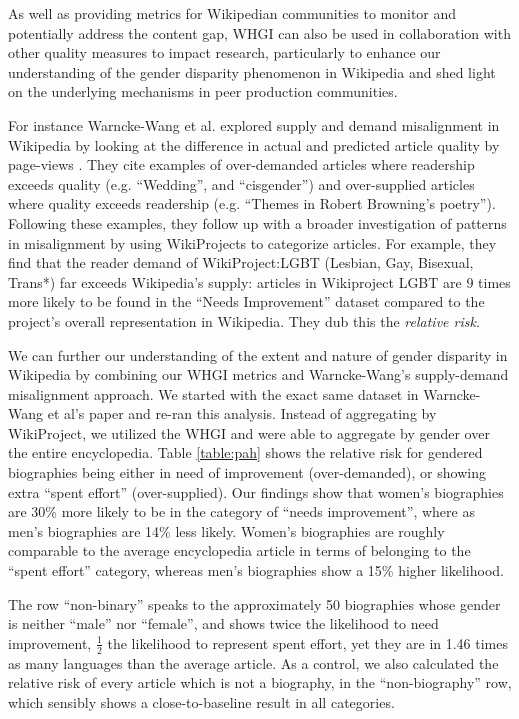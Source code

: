 \documentclass{sig-alternate-05-2015}
\begin{document}
As well as providing metrics for Wikipedian communities to monitor and potentially address the content gap, WHGI can also be used in collaboration with other quality measures to impact research, particularly to enhance our understanding of the gender disparity phenomenon in Wikipedia and shed light on the underlying mechanisms in peer production communities.

 For instance Warncke-Wang et al. explored supply and demand misalignment in Wikipedia by looking at the difference in actual and predicted article quality by page-views \cite{warncke-wang_misalignment_2015}. They cite examples of over-demanded articles where readership exceeds quality (e.g. ``Wedding'', and ``cisgender'') and over-supplied articles where quality exceeds readership (e.g. ``Themes in Robert Browning's poetry''). Following these examples, they follow up with a broader investigation of patterns in misalignment by using WikiProjects to categorize articles. For example, they find that the reader demand of WikiProject:LGBT (Lesbian, Gay, Bisexual, Trans*) far exceeds Wikipedia’s supply: articles in Wikiproject LGBT are 9 times more likely to be found in the ``Needs Improvement'' dataset compared to the project’s overall representation in Wikipedia. They dub this the \textit{relative risk}\cite{davies_when_1998}.

We can further our understanding of the extent and nature of gender disparity in Wikipedia by combining our WHGI metrics and Warncke-Wang’s supply-demand misalignment approach. We started with the exact same dataset in Warncke-Wang et al's paper and re-ran this analysis. Instead of aggregating by WikiProject, we utilized the WHGI and were able to aggregate by gender over the entire encyclopedia. Table \ref{table:pah} shows the relative risk for gendered biographies being either in need of improvement (over-demanded), or showing extra ``spent effort'' (over-supplied). Our findings show that women's biographies are 30\% more likely to be in the category of ``needs improvement'', where as men's biographies are 14\% less likely. Women's biographies are roughly comparable to the average encyclopedia article in terms of belonging to the ``spent effort'' category, whereas men's biographies show a 15\% higher likelihood.

The row ``non-binary'' speaks to the approximately 50 biographies whose gender is neither ``male'' nor ``female'', and shows twice the likelihood to need improvement, $\frac{1}{2}$ the likelihood to represent spent effort, yet they are in 1.46 times as many languages than the average article. As a control, we also calculated the relative risk of every article which is not a biography, in the ``non-biography'' row, which sensibly shows a close-to-baseline result in all categories. 
\end{document}
